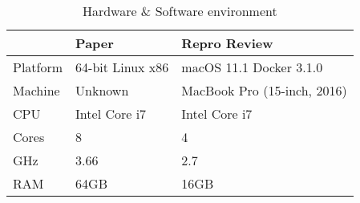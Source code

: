 \begin{table}[h]
	\caption[Short description]{Hardware \& Software environment}%
	\label{table:environment}
	\begin{tabular*}{\linewidth}{ !{\extracolsep\fill} l l l } %
		\toprule
						& Paper				& Repro Review					\\
		\midrule
			Platform	& 64-bit Linux x86	& macOS 11.1 Docker 3.1.0		\\
			Machine		& Unknown			& MacBook Pro (15-inch, 2016)	\\
		\midrule
			CPU			& Intel Core i7		& Intel Core i7					\\
			Cores		& 8					& 4								\\
			GHz			& 3.66				& 2.7							\\
			RAM			& 64GB				& 16GB							\\
		\bottomrule
	\end{tabular*}
\end{table}
